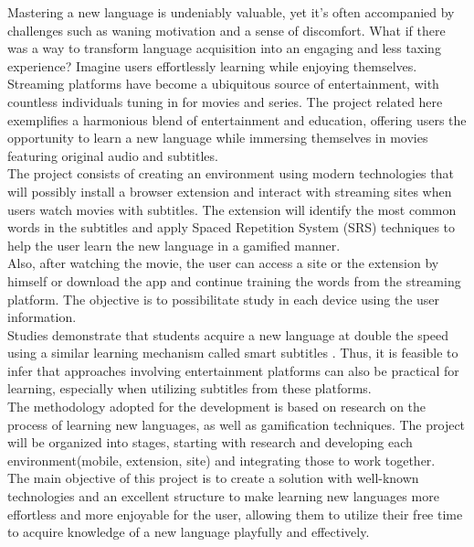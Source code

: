 \documentclass[12pt]{article}
\begin{document}
Mastering a new language is undeniably valuable, yet it's often accompanied by challenges such as waning motivation and a sense of discomfort. What if there was a way to transform language acquisition into an engaging and less taxing experience? Imagine users effortlessly learning while enjoying themselves. \\
Streaming platforms have become a ubiquitous source of entertainment, with countless individuals tuning in for movies and series. The project related here exemplifies a harmonious blend of entertainment and education, offering users the opportunity to learn a new language while immersing themselves in movies featuring original audio and subtitles. \\
The project consists of creating an environment using modern technologies that will possibly install a browser extension and interact with streaming sites when users watch movies with subtitles. The extension will identify the most common words in the subtitles and apply Spaced Repetition System (SRS) techniques to help the user learn the new language in a gamified manner. \\ 
Also, after watching the movie, the user can access a site or the extension by himself or download the app and continue training the words from the streaming platform. The objective is to possibilitate study in each device using the user information. \\ 
Studies demonstrate that students acquire a new language at double the speed using a similar learning mechanism called smart subtitles \cite{Kovacs13}. Thus, it is feasible to infer that approaches involving entertainment platforms can also be practical for learning, especially when utilizing subtitles from these platforms. \\
The methodology adopted for the development is based on research on the process of learning new languages, as well as gamification techniques. The project will be organized into stages, starting with research and developing each environment(mobile, extension, site) and integrating those to work together. \\
The main objective of this project is to create a solution with well-known technologies and an excellent structure to make learning new languages more effortless and more enjoyable for the user, allowing them to utilize their free time to acquire knowledge of a new language playfully and effectively.
\end{document}
